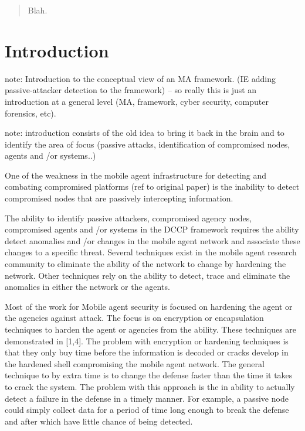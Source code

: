\documentclass{acm_proc_article-sp}
\begin{document}
\maketitle
\begin{abstract}
Blah.
\end{abstract}




\section{Introduction}
note: Introduction to the conceptual view of an MA framework. (IE adding passive-attacker detection to the framework) -- so really this is just an introduction at a general level (MA, framework, cyber security, computer forensics, etc).

note: introduction consists of the old idea to bring it back in the brain and to identify the area of focus (passive attacks, identification of compromised nodes, agents and /or systems..)



One of the weakness in the mobile agent infrastructure for detecting and combating compromised platforms (ref to original paper) is the inability to detect compromised nodes that are passively intercepting information.

The ability to identify passive attackers, compromised agency nodes, compromised agents and /or systems in the DCCP framework requires the ability detect anomalies and /or changes in the mobile agent network and associate these changes to a specific threat. Several techniques exist in the mobile agent research community to eliminate the ability of the network to change by hardening the network. Other techniques rely on the ability to detect, trace and eliminate the anomalies in either the network or the agents. 
 
Most of the work for Mobile agent security is focused on hardening the agent or the agencies against attack. The focus is on encryption or encapsulation techniques to harden the agent or agencies from the ability. These techniques are demonstrated in [1,4]. The problem with encryption or hardening techniques is that they only buy time before the information is decoded or cracks develop in the hardened shell compromising the mobile agent network. The general technique to by extra time is to change the defense faster than the time it takes to crack the system. The problem with this approach is the in ability to actually detect a failure in the defense in a timely manner. For example, a passive node could simply collect data for a period of time long enough to break the defense and after which have little chance of being detected.  
\end{document}
